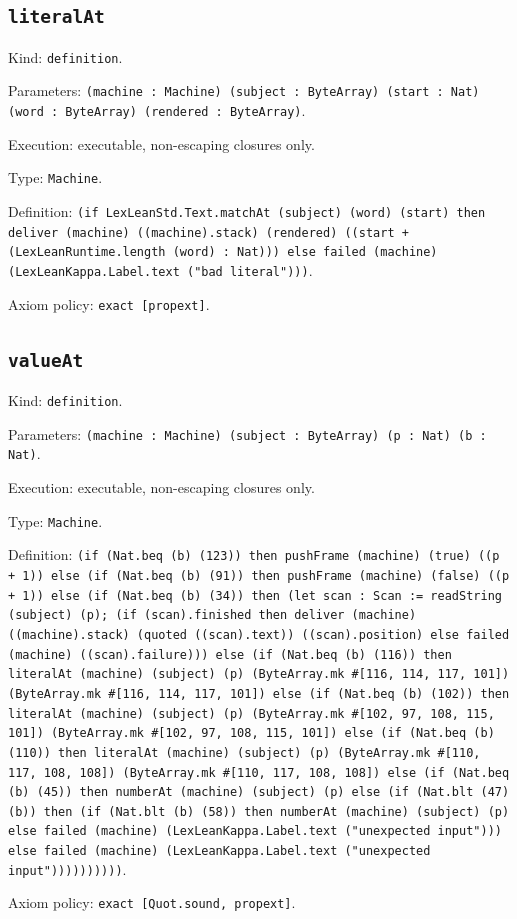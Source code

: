 \documentclass[11pt]{article}
\begin{document}
\subsection*{\texttt{literalAt}}
\noindent Kind: \texttt{definition}.\par
\noindent Parameters: \texttt{(machine : Machine) (subject : ByteArray) (start : Nat) (word : ByteArray) (rendered : ByteArray)}.\par
\noindent Execution: executable, non-escaping closures only.\par
\noindent Type: \texttt{Machine}.\par
\noindent Definition: \texttt{(if LexLeanStd.Text.matchAt (subject) (word) (start) then deliver (machine) ((machine).stack) (rendered) ((start + (LexLeanRuntime.length (word) : Nat))) else failed (machine) (LexLeanKappa.Label.text ("bad literal")))}.\par
\noindent Axiom policy: \texttt{exact [propext]}.\par
\subsection*{\texttt{valueAt}}
\noindent Kind: \texttt{definition}.\par
\noindent Parameters: \texttt{(machine : Machine) (subject : ByteArray) (p : Nat) (b : Nat)}.\par
\noindent Execution: executable, non-escaping closures only.\par
\noindent Type: \texttt{Machine}.\par
\noindent Definition: \texttt{(if (Nat.beq (b) (123)) then pushFrame (machine) (true) ((p + 1)) else (if (Nat.beq (b) (91)) then pushFrame (machine) (false) ((p + 1)) else (if (Nat.beq (b) (34)) then (let scan : Scan := readString (subject) (p); (if (scan).finished then deliver (machine) ((machine).stack) (quoted ((scan).text)) ((scan).position) else failed (machine) ((scan).failure))) else (if (Nat.beq (b) (116)) then literalAt (machine) (subject) (p) (ByteArray.mk \#[116, 114, 117, 101]) (ByteArray.mk \#[116, 114, 117, 101]) else (if (Nat.beq (b) (102)) then literalAt (machine) (subject) (p) (ByteArray.mk \#[102, 97, 108, 115, 101]) (ByteArray.mk \#[102, 97, 108, 115, 101]) else (if (Nat.beq (b) (110)) then literalAt (machine) (subject) (p) (ByteArray.mk \#[110, 117, 108, 108]) (ByteArray.mk \#[110, 117, 108, 108]) else (if (Nat.beq (b) (45)) then numberAt (machine) (subject) (p) else (if (Nat.blt (47) (b)) then (if (Nat.blt (b) (58)) then numberAt (machine) (subject) (p) else failed (machine) (LexLeanKappa.Label.text ("unexpected input"))) else failed (machine) (LexLeanKappa.Label.text ("unexpected input"))))))))))}.\par
\noindent Axiom policy: \texttt{exact [Quot.sound, propext]}.\par
\end{document}
